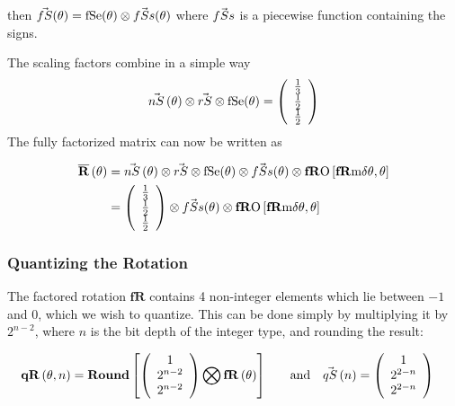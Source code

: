 then $\fS (\theta) = \fSe (\theta) \otimes \fSs(\theta)$ where $\fSs$ is a piecewise function containing the signs. 

The scaling factors combine in a simple way
\begin{equation}
\nS[\theta] \otimes \rS \otimes \fSe (\theta)   = 
\left(
\begin{array}{c}
 \frac{1}{3}  \\
 \frac{1}{2}\\
 \frac{1}{2} \\
\end{array}
\right)
\end{equation}
The fully factorized matrix can now be written as

\begin{align*}
\nR[\theta] & = \nS[\theta] \otimes \rS \otimes \fSe (\theta) \otimes \fSs(\theta) \otimes\fRO \left[  \fRm{ \thetaA }, \theta \right] \\
& = \left(
\begin{array}{c}
 \frac{1}{3}  \\
 \frac{1}{2}\\
 \frac{1}{2} \\
\end{array}
\right) \otimes \fSs(\theta) \otimes\fRO \left[  \fRm{\thetaA}, \theta \right] \\
\end{align*}

\subsubsection{Quantizing the Rotation}

The factored rotation $\mathbf{fR}$ contains 4 non-integer elements which lie between $-1$ and $0$, which we wish to quantize. This can be done simply by multiplying it by $2^{n - 2}$, where $n$ is the bit depth of the integer type, and rounding the result: 

\begin{align}
 \qR[\theta, n] &=
\textbf{Round}\left[
\left(
\begin{array}{c}
 1  \\
 2^{n - 2} \\
 2^{n - 2}  \\
\end{array}
\right)
\bigotimes
\fR[\theta] \right] 
\quad &\text{and} \quad 
\qS[n] &= \left(
\begin{array}{c}
 1  \\
 2^{2-n } \\
 2^{2-n }  \\
\end{array}
\right) 
\end{align}



